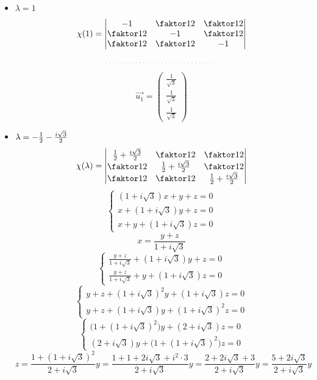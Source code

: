 \begin{itemize}
	\item $ \lambda = 1 $
    $$ \chi(1) =
    \begin{vmatrix}
    	-1 & \faktor12 & \faktor12 \\
        \faktor12 & -1 & \faktor12 \\
        \faktor12 & \faktor12 & -1
    \end{vmatrix} $$
    $$ \widedots $$
    $$ \vec{u_1} =
    \begin{pmatrix}
        \frac1{\sqrt3} \\
        \frac1{\sqrt3} \\
        \frac1{\sqrt3}
    \end{pmatrix} $$
    \item $ \lambda = -\half - \half[i\sqrt3] $
    $$ \chi(\lambda) =
    \begin{vmatrix}
    	\half + \half[i\sqrt3] & \faktor12 & \faktor12 \\
        \faktor12 & \half + \half[i\sqrt3] & \faktor12 \\
        \faktor12 & \faktor12 & \half + \half[i\sqrt3]
    \end{vmatrix} $$
    $$
    \begin{cases}
    	(1 + i\sqrt3)x + y + z = 0 \\
        x + (1 + i\sqrt3)y + z = 0 \\
        x + y + (1 + i\sqrt3)z = 0
    \end{cases} $$
    $$ x = \frac{y + z}{1 + i\sqrt3} $$
    $$
    \begin{cases}
    	\frac{y + z}{1 + i\sqrt3} + (1 + i\sqrt3)y + z = 0 \\
        \frac{y + z}{1 + i\sqrt3} + y + (1 + i\sqrt3)z = 0
    \end{cases} $$
    $$
    \begin{cases}
    	y + z + (1 + i\sqrt3)^2 y + (1 + i\sqrt3)z = 0 \\
        y + z + (1 + i\sqrt3)y + (1 + i\sqrt3)^2 z = 0
    \end{cases} $$
    $$
    \begin{cases}
    	\bigg(1 + (1 + i\sqrt3)^2 \bigg)y + (2 + i\sqrt3)z = 0 \\
        (2 + i\sqrt3)y + \bigg( 1 + (1 + i\sqrt3)^2 \bigg)z = 0
    \end{cases} $$
    $$ z = \frac{1 + (1 + i\sqrt3)^2}{2 + i\sqrt3} y = \frac{1 + 1 + 2i\sqrt3 + i^2 \cdot 3}{2 + i\sqrt3} y = \frac{2 + 2i\sqrt3 + 3}{2 + i\sqrt3} y = \frac{5 + 2i\sqrt3}{2 + i\sqrt3} y $$

\end{itemize}
